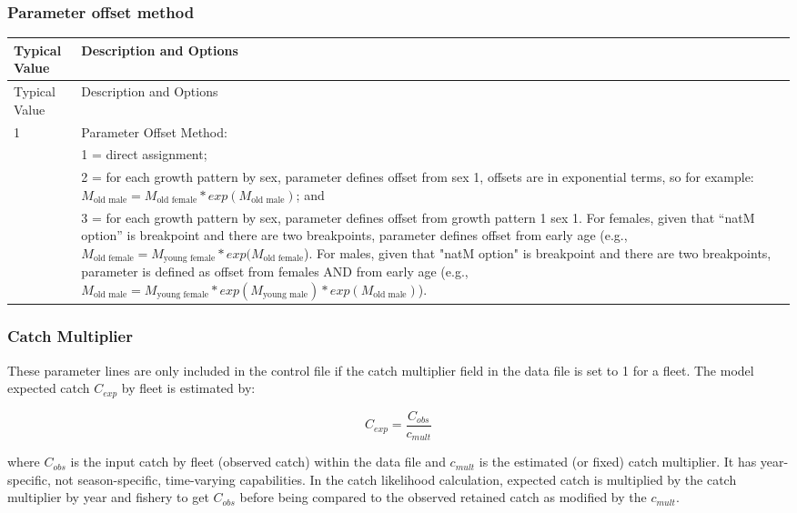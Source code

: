 \subsubsection{Parameter offset method}

\begin{longtable}{p{0.5cm} p{2cm} p{13cm}}
	\hline	
	\multicolumn{2}{l}{Typical Value} & Description and Options\Tstrut\Bstrut\\
	\hline
	\endfirsthead

	\hline
	\multicolumn{2}{l}{Typical Value} & Description and Options\Tstrut\Bstrut\\
	\hline
	\endhead
	\hline

	\endfoot
	
	\endlastfoot

	 1 & & Parameter Offset Method: \Tstrut\Bstrut\\
	   & & 1 = direct assignment; \\
	   & & 2 = for each growth pattern by sex, parameter defines offset from sex 1, offsets are in exponential terms, so for example: $M_{\text{old male}} = M_{\text{old female}}*exp(M_{\text{old male}})$; and\\
	   & & 3 = for each growth pattern by sex, parameter defines offset from growth pattern 1 sex 1.  For females, given that “natM option” is breakpoint and there are two breakpoints, parameter defines offset from early age (e.g., $M_{\text{old female}} = M_{\text{young female}}*exp(M_{\text{old female}}$). For males, given that "natM option" is breakpoint and there are two breakpoints, parameter is defined as offset from females AND from early age (e.g., $M_{\text{old male}} = M_{\text{young female}}*exp(M_{\text{young male}})*exp(M_{\text{old male}})$).\Bstrut\\
	\hline
\end{longtable}


\subsubsection{Catch Multiplier}
These  parameter lines are only included in the control file if the catch multiplier field in the data file is set to 1 for a fleet. The model expected catch $C_{exp}$ by fleet is estimated by:

\begin{equation}
C_{exp} =  \frac{C_{obs}}{c_{mult}}
\end{equation}

where $C_{obs}$ is the input catch by fleet (observed catch) within the data file and $c_{mult}$ is the estimated (or fixed) catch multiplier. It has year-specific, not season-specific, time-varying capabilities.  In the catch likelihood calculation, expected catch is multiplied by the catch multiplier by year and fishery to get $C_{obs}$ before being compared to the observed retained catch as modified by the $c_{mult}$.  

